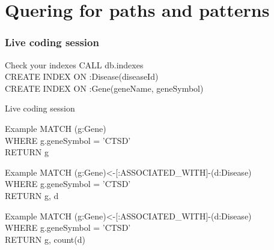 \documentclass[12pt]{beamer}
\begin{document}
    
    \section{Quering for paths and patterns}
    \begin{frame}
        \frametitle{Live coding session}
        \begin{block}{Check your indexes}
            CALL db.indexes\\
            CREATE INDEX ON :Disease(diseaseId)\\
            CREATE INDEX ON :Gene(geneName, geneSymbol)\\
        \end{block}
    \end{frame}
    
    \begin{frame}{Live coding session}
        \begin{block}{Example}
            MATCH (g:Gene)\\ 
            \hspace{1cm} WHERE g.geneSymbol = 'CTSD'\\
            \hspace{1cm} RETURN g
        \end{block}
        \begin{block}{Example}
            MATCH (g:Gene)\textless-[:ASSOCIATED\_WITH]-(d:Disease)\\
            \hspace{1cm} WHERE g.geneSymbol = 'CTSD'\\
            \hspace{1cm} RETURN g, d\\
        \end{block}
        \begin{block}{Example}
            MATCH (g:Gene)\textless-[:ASSOCIATED\_WITH]-(d:Disease)\\
            \hspace{1cm} WHERE g.geneSymbol = 'CTSD'\\
            \hspace{1cm} RETURN g, count(d)\\
        \end{block}
    \end{frame}
    
\end{document}
